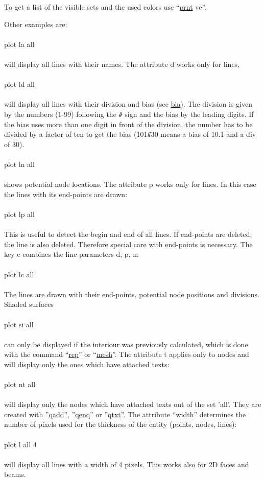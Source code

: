 \documentclass{article}
\providecommand{\htmlref}[2]{\hyperref[#2]{#1}}
\begin{document}
To get a list of the visible sets and the used colors use ``\htmlref{prnt}{prnt} ve''.

Other examples are:\\\\plot la all\\\\will display all lines with their names. The attribute d works only for lines,\\\\plot ld all\\\\ will display all lines with their division and bias (see \htmlref{bia}{bia}). The division is given by the numbers (1-99) following the \verb_#_ sign and the bias by the leading digits. If the bias uses more than one digit in front of the division, the number has to be divided by a factor of ten to get the bias (101\verb_#_30 means a bias of 10.1 and a div of 30). \\\\plot ln all\\\\shows potential node locations. The attribute p works only for lines. In this case the lines with its end-points are drawn:\\\\plot lp all\\\\This is useful to detect the begin and end of all lines. If end-points are deleted, the line is also deleted. Therefore special care with end-points is necessary. The key c combines the line parameters d, p, n:\\\\plot lc all\\\\The lines are drawn with their end-points, potential node positions and divisions.
Shaded surfaces\\\\plot si all\\\\ can only be displayed if the interiour was previously calculated, which is done with the command ``\htmlref{rep}{rep}'' or ``\htmlref{mesh}{mesh}''. The attribute t applies only to nodes and will display only the ones which have attached texts:\\\\plot nt all\\\\will display only the nodes which have attached texts out of the set 'all'. They are created with ''\htmlref{qadd}{qadd}'', ''\htmlref{qenq}{qenq}'' or ''\htmlref{qtxt}{qtxt}''. The attribute ``width'' determines the number of pixels used for the thickness of the entity (points, nodes, lines):\\\\plot l all 4\\\\will display all lines with a width of 4 pixels. This works also for 2D faces and beams.
\end{document}
